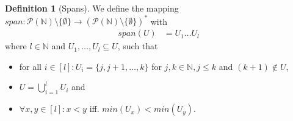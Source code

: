 \documentclass{tudscrartcl}
\theoremstyle{definition}
\newtheorem{definition}{Definition}[section]
\begin{document}
\begin{definition}[Spans]
	We define the mapping $span: \mathcal{P}(\mathbb{N}) \setminus \{\emptyset\}
	\to (\mathcal{P}(\mathbb{N}) \setminus \{\emptyset\})^*$ with
	\begin{align*}
		span(U) &= U_1 \ldots U_l
	\end{align*}
	where $l \in \mathbb{N}$ and $U_1, \ldots, U_l \subseteq U$, such that
	\begin{itemize}
		\item for all $i \in [l]: U_i = \{j, j+1, \ldots, k\}$
			for $j, k \in \mathbb{N}, j \leq k$ and $(k+1) \notin U$,
		\item $U = \bigcup_{i=1}^l U_i$ and
		\item $\forall x, y \in [l]: x < y$ iff. $min(U_x) < min(U_y)$.
	\end{itemize}
\end{definition}
\end{document}
